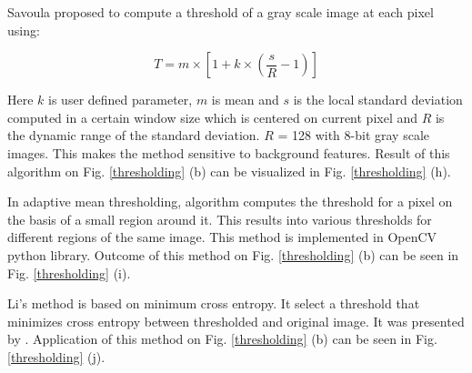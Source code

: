 \documentclass[11pt]{article}
\begin{document}
Savoula proposed to compute a threshold of a gray scale image at each pixel using:

\begin{equation}
T=m \times\left[1+k \times\left(\frac{s}{R}-1\right)\right]
\end{equation}

Here $k$ is user defined parameter, $m$ is mean and $s$ is the local standard deviation computed in a certain window size which is centered on current pixel and $R$ is the dynamic range of the standard deviation. $R$ = 128 with 8-bit gray scale images. This makes the method sensitive to background features. Result of this algorithm on Fig. \ref{thresholding} (b) can be visualized in Fig. \ref{thresholding} (h).

In adaptive mean thresholding, algorithm computes the threshold for a pixel on the basis of a small region around it. This results into various thresholds for different regions of the same image. This method is implemented in OpenCV python library. Outcome of this method on Fig. \ref{thresholding} (b) can be seen in Fig. \ref{thresholding} (i).

Li's method is based on minimum cross entropy. It select a threshold that minimizes cross entropy between thresholded and original image. It was presented by \cite{li1993minimum}. Application of this method on Fig. \ref{thresholding} (b) can be seen in Fig. \ref{thresholding} (j).
\end{document}

